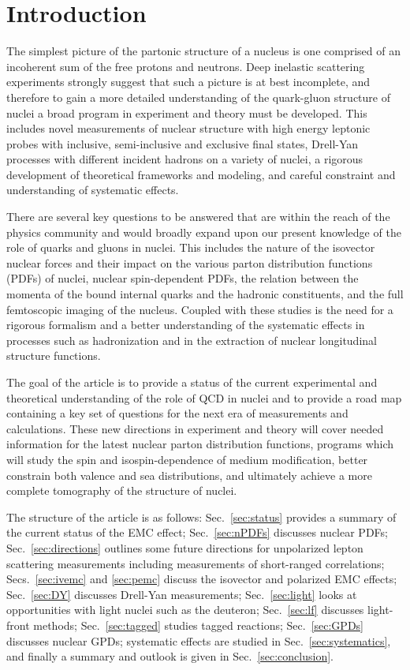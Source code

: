 \section{Introduction}

The simplest picture of the partonic structure of a nucleus is one comprised of an incoherent sum of the free protons and neutrons. Deep inelastic scattering experiments strongly suggest that such a picture is at best incomplete, and therefore to gain a more detailed understanding of the quark-gluon structure of nuclei a broad program in experiment and theory must be developed.  This includes novel measurements of nuclear structure with high energy leptonic probes with inclusive, semi-inclusive and exclusive final states, Drell-Yan processes with different incident hadrons on a variety of nuclei, a rigorous development of theoretical frameworks and modeling, and careful constraint and understanding of systematic effects.

There are several key questions to be answered that are within the reach of the physics community and would broadly expand upon our present knowledge of the role of quarks and gluons in nuclei.  This includes the nature of the isovector nuclear forces and their impact on the various parton distribution functions (PDFs) of nuclei, nuclear spin-dependent PDFs, the relation between the momenta of the bound internal quarks and the hadronic constituents, and the full femtoscopic imaging of the nucleus.  Coupled with these studies is the need for a rigorous formalism and a better understanding of the systematic effects in processes such as hadronization and in the extraction of nuclear longitudinal structure functions. 

The goal of the article is to provide a status of the current experimental and theoretical understanding of the role of QCD in nuclei and to provide a road map containing a key set of questions for the next era of measurements and calculations. These new directions in experiment and theory will cover needed information for the latest nuclear parton distribution functions, programs which will study the spin and isospin-dependence of medium modification, better constrain both valence and sea distributions, and ultimately achieve a more complete tomography of the structure of nuclei. 

The structure of the article is as follows: Sec.~\ref{sec:status} provides a summary of the current status of the EMC effect; Sec.~\ref{sec:nPDFs} discusses nuclear PDFs; Sec.~\ref{sec:directions} outlines some future directions for unpolarized lepton scattering measurements including measurements of short-ranged correlations; Secs.~\ref{sec:ivemc} and \ref{sec:pemc} discuss the isovector and polarized EMC effects; Sec.~\ref{sec:DY} discusses Drell-Yan measurements; Sec.~\ref{sec:light} looks at opportunities with light nuclei such as the deuteron; Sec.~\ref{sec:lf} discusses light-front methods; Sec.~\ref{sec:tagged} studies tagged reactions; Sec.~\ref{sec:GPDs} discusses nuclear GPDs; systematic effects are studied in Sec.~\ref{sec:systematics}, and finally a summary and outlook is given in Sec.~\ref{sec:conclusion}.
